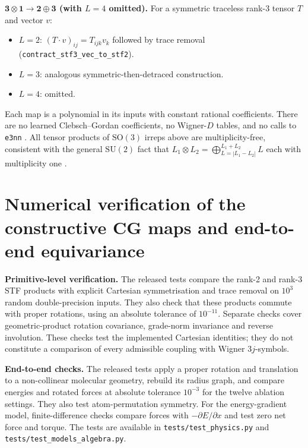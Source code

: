 \textbf{$\mathbf{3} \otimes \mathbf{1} \to \mathbf{2} \oplus \mathbf{3}$ (with $L{=}4$ omitted).} For a symmetric traceless rank-3 tensor $T$ and vector $v$:
\begin{itemize}
    \item $L{=}2$: $(T \cdot v)_{ij} = T_{ijk}v_k$ followed by trace removal (\texttt{contract\_stf3\_vec\_to\_stf2}).
    \item $L{=}3$: analogous symmetric-then-detraced construction.
    \item $L{=}4$: omitted.
\end{itemize}

Each map is a polynomial in its inputs with constant rational coefficients. There are no learned Clebsch--Gordan coefficients, no Wigner-$D$ tables, and no calls to \texttt{e3nn} \citep{geiger2022e3nn}. All tensor products of $\mathrm{SO}(3)$ irreps above are multiplicity-free, consistent with the general $\mathrm{SU}(2)$ fact that $L_1 \otimes L_2 = \bigoplus_{L=|L_1-L_2|}^{L_1+L_2} L$ each with multiplicity one \citep{varshalovich1988quantum}.

\section{Numerical verification of the constructive CG maps and end-to-end equivariance}\label{supp:cg_test}

\textbf{Primitive-level verification.} The released tests compare the rank-2 and rank-3 STF products with explicit Cartesian symmetrisation and trace removal on $10^3$ random double-precision inputs. They also check that these products commute with proper rotations, using an absolute tolerance of $10^{-11}$. Separate checks cover geometric-product rotation covariance, grade-norm invariance and reverse involution. These checks test the implemented Cartesian identities; they do not constitute a comparison of every admissible coupling with Wigner $3j$-symbols.

\textbf{End-to-end checks.} The released tests apply a proper rotation and translation to a non-collinear molecular geometry, rebuild its radius graph, and compare energies and rotated forces at absolute tolerance $10^{-3}$ for the twelve ablation settings. They also test atom-permutation symmetry. For the energy-gradient model, finite-difference checks compare forces with $-\partial E/\partial x$ and test zero net force and torque. The tests are available in \texttt{tests/test\_physics.py} and \texttt{tests/test\_models\_algebra.py}.

